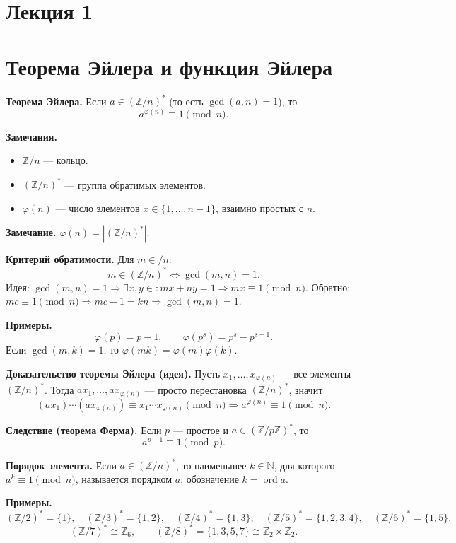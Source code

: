\documentclass[12pt,a4paper]{article}
\newcommand{\Z}{\mathbb{Z}}
\DeclareMathOperator{\gcdop}{gcd}
\DeclareMathOperator{\ord}{ord}
\begin{document}
\section*{\centering Лекция 1}
\section{Теорема Эйлера и функция Эйлера}

\textbf{Теорема Эйлера.} Если $a\in(\Z/n)^{\ast}$ (то есть $\gcdop(a,n)=1$), то
\[
a^{\varphi(n)} \equiv 1 \pmod n.
\]

\textbf{Замечания.}
\begin{itemize}
  \item $\Z/n$ — кольцо.
  \item $(\Z/n)^{\ast}$ — группа обратимых элементов.
  \item $\varphi(n)$ — число элементов $x\in\{1,\dots,n-1\}$, взаимно простых с $n$.
\end{itemize}

\textbf{Замечание.} $\varphi(n)=|(\Z/n)^{\ast}|$.

\textbf{Критерий обратимости.} Для $m\in/n$:
\[
m\in(\Z/n)^{\ast} \iff \gcdop(m,n)=1.
\]
Идея: $\gcdop(m,n)=1 \Rightarrow \exists x,y\in: mx+ny=1 \Rightarrow mx\equiv 1\pmod n$.
Обратно: $mc\equiv 1\pmod n \Rightarrow mc-1=kn \Rightarrow \gcdop(m,n)=1$.

\textbf{Примеры.}
\[
\varphi(p)=p-1,\qquad
\varphi(p^{s})=p^{s}-p^{s-1}.
\]
Если $\gcdop(m,k)=1$, то $\varphi(mk)=\varphi(m)\varphi(k)$.

\textbf{Доказательство теоремы Эйлера (идея).}
Пусть $x_1,\dots,x_{\varphi(n)}$ — все элементы $(\Z/n)^{\ast}$.
Тогда $ax_1,\dots,ax_{\varphi(n)}$ — просто перестановка $(\Z/n)^{\ast}$, значит
\[
(ax_1)\cdots(ax_{\varphi(n)}) \equiv x_1\cdots x_{\varphi(n)} \pmod n
\Rightarrow a^{\varphi(n)}\equiv 1\pmod n.
\]

\textbf{Следствие (теорема Ферма).} Если $p$ — простое и $a\in(\Z/p\Z)^{\ast}$, то
\[
a^{p-1}\equiv 1 \pmod p.
\]

\textbf{Порядок элемента.}
Если $a\in(\Z/n)^{\ast}$, то наименьшее $k\in \mathbb{N}$, для которого $a^k\equiv 1\pmod n$,
называется порядком $a$; обозначение $k=\ord a$.

\textbf{Примеры.}
\[
(\Z/2)^{\ast}=\{1\},\quad
(\Z/3)^{\ast}=\{1,2\},\quad
(\Z/4)^{\ast}=\{1,3\},\quad
(\Z/5)^{\ast}=\{1,2,3,4\},\quad
(\Z/6)^{\ast}=\{1,5\}.
\]
\[
(\Z/7)^{\ast}\cong \Z_6,\qquad
(\Z/8)^{\ast}=\{1,3,5,7\}\cong \Z_2\times \Z_2.
\]
\end{document}
